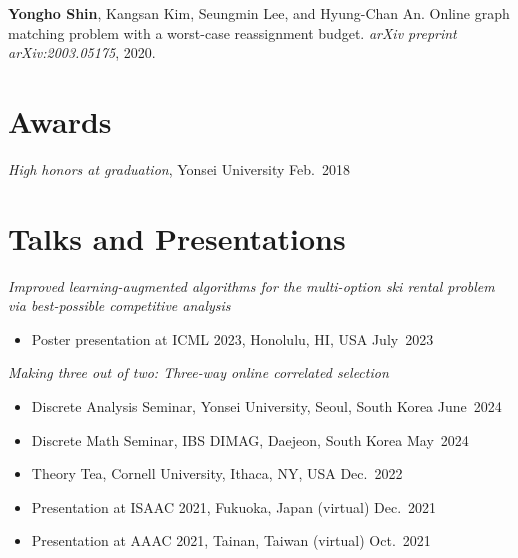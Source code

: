 \documentclass{article}
\newcommand{\killinitspace}{-0.7em}
\begin{document}
\textbf{Yongho Shin}, Kangsan Kim, Seungmin Lee, and Hyung-Chan An. Online graph matching problem with a worst-case reassignment budget. \emph{arXiv preprint arXiv:2003.05175}, 2020.

\section{Awards}
\textsl{High honors at graduation}, Yonsei University \hfill Feb.~2018

\section{Talks and Presentations}
\textsl{Improved learning-augmented algorithms for the multi-option ski rental problem via best-possible competitive analysis}
\vspace{\killinitspace}
\begin{itemize}
\item Poster presentation at ICML 2023, Honolulu, HI, USA \hfill July~2023
\end{itemize}

\textsl{Making three out of two: Three-way online correlated selection}
\vspace{\killinitspace}
\begin{itemize}
\item Discrete Analysis Seminar, Yonsei University, Seoul, South Korea \hfill June~2024
\item Discrete Math Seminar, IBS DIMAG, Daejeon, South Korea \hfill May~2024
\item Theory Tea, Cornell University, Ithaca, NY, USA \hfill Dec.~2022
\item Presentation at ISAAC 2021, Fukuoka, Japan (virtual) \hfill Dec.~2021
\item Presentation at AAAC 2021, Tainan, Taiwan (virtual) \hfill Oct.~2021
\end{itemize}
\end{document}
